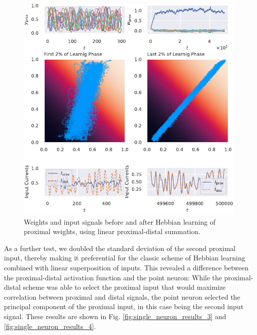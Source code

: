 \documentclass[10pt,a4paper]{article}
\begin{document}
\begin{figure}
\centering
\includegraphics[width=\textwidth]{./figures/fig2.pdf}
\caption{Weights and input signals before and after Hebbian learning of proximal weights, using linear proximal-distal summation.}
\label{fig:single_neuron_results_2}
\end{figure}

As a further test, we doubled the standard deviation of the second proximal input, thereby making it preferential for the classic scheme of Hebbian learning combined with linear superposition of inputs. This revealed a difference between the proximal-distal activation function and the point neuron: While the proximal-distal scheme was able to select the proximal input that would maximize correlation between proximal and distal signals, the point neuron selected the principal component of the proximal input, in this case being the second input signal. These results are shown in Fig. \ref{fig:single_neuron_results_3} and \ref{fig:single_neuron_results_4}.
\end{document}
